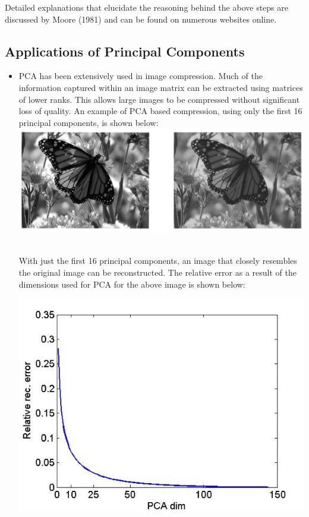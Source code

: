 \documentclass{article}
\begin{document}
Detailed explanations that elucidate the reasoning behind the above steps are discussed by Moore (1981) and can be found on numerous websites online.

\subsection{Applications of Principal Components}
\begin{itemize}
\item \begin{minipage}[t]{\linewidth}
	PCA has been extensively used in image compression. Much of the 	information captured within an image matrix can be extracted using matrices of lower ranks. This allows large images to be compressed without significant loss of quality. An example of PCA based compression, using only the first 16 principal components, is shown below:\\

  \centering
  \includegraphics[width=\textwidth]{compare}
  \label{fig:sample_figure}

\raggedright
$\,$\\
With just the first 16 principal components, an image that closely resembles the original image can be reconstructed. The relative error as a result of the dimensions used for PCA for the above image is shown below:

  \centering
  \includegraphics[width=\textwidth]{PCA_dim}
  \label{fig:sample_figure}
\end{minipage}


\end{itemize}
\end{document}

